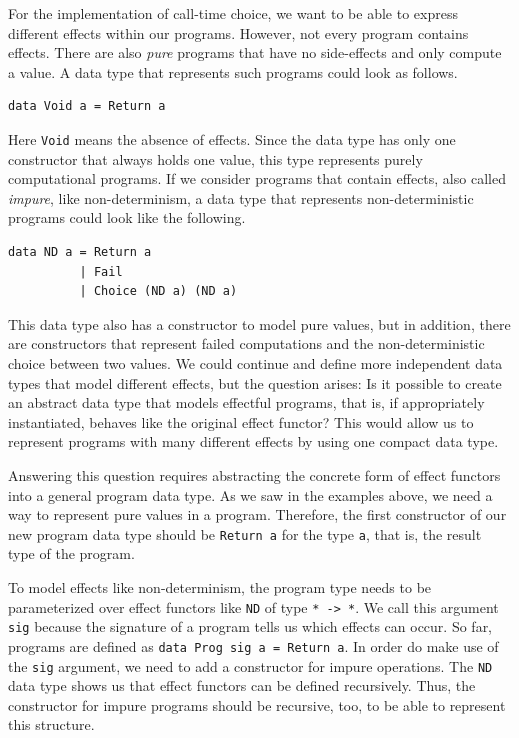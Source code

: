 \documentclass[a4paper, 11pt, fleqn, twoside]{scrreprt}
\newcommand{\hinl}[1]{\texttt{#1}}
\begin{document}
For the implementation of call-time choice, we want to be able to express different effects within our programs.
However, not every program contains effects.
There are also \textit{pure} programs that have no side-effects and only compute a value.
A data type that represents such programs could look as follows.

\begin{verbatim}
data Void a = Return a
\end{verbatim}

Here \hinl{Void} means the absence of effects. Since the data type has only one constructor that always holds one value, this type represents purely computational programs.
If we consider programs that contain effects, also called \textit{impure}, like non-determinism, a data type that represents non-deterministic programs could look like the following.

\begin{verbatim}
data ND a = Return a
          | Fail
          | Choice (ND a) (ND a)
\end{verbatim}

This data type also has a constructor to model pure values, but in addition, there are constructors that represent failed computations and the non-deterministic choice between two values.
We could continue and define more independent data types that model different effects, but the question arises: Is it possible to create an abstract data type that models effectful programs, that is, if appropriately instantiated, behaves like the original effect functor?
This would allow us to represent programs with many different effects by using one compact data type.

Answering this question requires abstracting the concrete form of effect functors into a general program data type.
As we saw in the examples above, we need a way to represent pure values in a program.
Therefore, the first constructor of our new program data type should be \hinl{Return a} for the type \hinl{a}, that is, the result type of the program.

To model effects like non-determinism, the program type needs to be parameterized over effect functors like \hinl{ND} of type \hinl{* -> *}.
We call this argument \hinl{sig} because the signature of a program tells us which effects can occur.
So far, programs are defined as \hinl{data Prog sig a = Return a}.
In order do make use of the \hinl{sig} argument, we need to add a constructor for impure operations.
The \hinl{ND} data type shows us that effect functors can be defined recursively.
Thus, the constructor for impure programs should be recursive, too, to be able to represent this structure.
\end{document}
